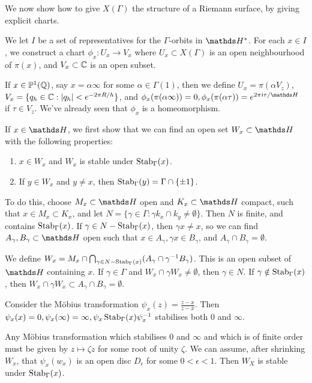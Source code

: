 \documentclass[10pt,a4paper]{article}
\begin{document}
We now show how to give $X(\Gamma)$ the structure of a Riemann surface, by giving explicit charts.

We let $I$ be a set of representatives for the $\Gamma$-orbits in $\H^\ast$. For each $x \in I$, we construct a chart $\phi_x : U_x \to V_x$ where $U_x \subset X(\Gamma)$ is an open neighbourhood of $\pi(x)$, and $V_x \subset \mathbb{C}$ is an open subset.

If $x \in \mathbb{P}^1(\mathbb{Q})$, say $x = \alpha\infty$ for some $\alpha \in \Gamma(1)$, then we define $U_x = \pi(\alpha V_z)$, $V_x = \{q_h \in \mathbb{C}: |q_h|< e^{-2\pi R/h}\}$, and $\phi_x(\pi(\alpha\infty)) = 0, \phi_x(\pi(\alpha \tau)) = e^{2\pi\im \tau/\H}$ if $\tau \in V_z$. We've already seen that $\phi_x$ is a homeomorphism.

If $x \in \H$, we first show that we can find an open set $W_x \subset \H$ with the following properties:
\begin{enumerate}
  \item $x \in W_x$ and $W_x$ is stable under $\operatorname{Stab}_\Gamma(x)$.
  \item If $y \in W_x$ and $y \neq x$, then $\operatorname{Stab}_\Gamma(y) = \Gamma \cap \{\pm 1\}$.
\end{enumerate}
To do this, choose $M_x \subset \H$ open and $K_x \subset \H$ compact, such that $x \in M_x \subset K_x$, and let $N = \{\gamma \in \Gamma: \gamma k_x \cap k_y \neq \emptyset\}$. Then $N$ is finite, and contains $\operatorname{Stab}_\Gamma(x)$. If $\gamma \in N - \operatorname{Stab}_\Gamma(x)$, then $\gamma x \neq x$, so we can find $A_\gamma, B_\gamma \subset \H$ open such that $x \in A_\gamma, \gamma x \in B_\gamma$, and $A_\gamma \cap B_\gamma = \emptyset.$

We define $W_x = M_x \cap \bigcap_{\gamma \in N - \operatorname{Stab}_\Gamma(x)} (A_\gamma \cap \gamma^{-1}B_\gamma)$. This is an open subset of $\H$ containing $x$. If $\gamma \in \Gamma$ and $W_x \cap \gamma W_x \neq \emptyset$, then $\gamma \in N$. If $\gamma \notin \operatorname{Stab}_{\Gamma}(x)$, then $W_x \cap \gamma W_x \subset A_\gamma \cap B_\gamma = \emptyset$.

Consider the M\"obius transformation $\psi_x(z) = \frac{z-x}{z-\bar{x}}$. Then $\psi_x(x) = 0, \psi_x(\infty)=\infty, \psi_x \operatorname{Stab}_\Gamma(x) \psi_x^{-1}$ stabilises both $0$ and $\infty$.

Any M\"obius transformation which stabilises $0$ and $\infty$ and which is of finite order must be given by $z \mapsto \zeta z$ for some root of unity $\zeta$. We can assume, after shrinking $W_x$, that $\psi_x(w_x)$ is an open disc $D_\epsilon$ for some $0 < \epsilon <1$. Then $W_X$ is stable under $\operatorname{Stab}_\Gamma(x)$.
\end{document}
